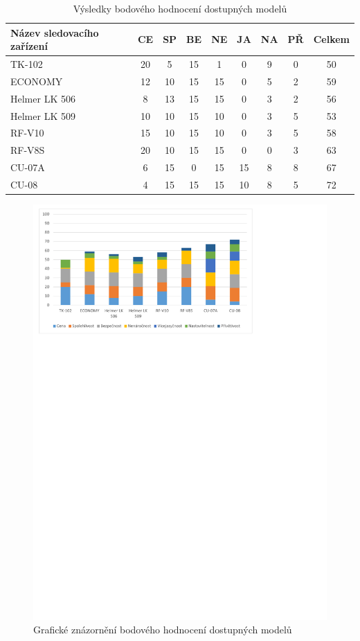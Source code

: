 \documentclass[FM,BP]{tulthesis}  %
\begin{document}
\renewcommand{\arraystretch}{1.5}
\begin{table}[H]
\begin{center}
\begin{tabular}{| l | c | c| c | c | c | c | c | c |}
\hline
Název sledovacího zařízení & CE & SP & BE & NE & JA & NA & PŘ & Celkem\\
\hline
\hline
TK-102 & 20 & 5 & 15 & 1 & 0 & 9 & 0 & 50\\
\hline
ECONOMY & 12 & 10 & 15 & 15 & 0 & 5 & 2 & 59\\
\hline
Helmer LK 506 & 8 & 13 & 15 & 15 & 0 & 3 & 2 & 56\\
\hline
Helmer LK 509 & 10 & 10 & 15 & 10 & 0 & 3 & 5 & 53\\
\hline
RF-V10 & 15 & 10 & 15 & 10 & 0 & 3 & 5 & 58\\
\hline
RF-V8S & 20 & 10 & 15 & 15 & 0 & 0 & 3 & 63\\
\hline
CU-07A & 6 & 15 & 0 & 15 & 15 & 8 & 8 & 67\\
\hline
CU-08 & 4 & 15 & 15 & 15 & 10 & 8 & 5 & 72\\
\hline
\end{tabular}
\end{center}
\caption{Výsledky bodového hodnocení dostupných modelů}
\end{table}

\begin{figure}[H]
\includegraphics[width=\textwidth]{graphs/graf_bodoveHodnoceni.pdf}
\caption{Grafické znázornění bodového hodnocení dostupných modelů}
\label{foto}
\end{figure}
\end{document}
